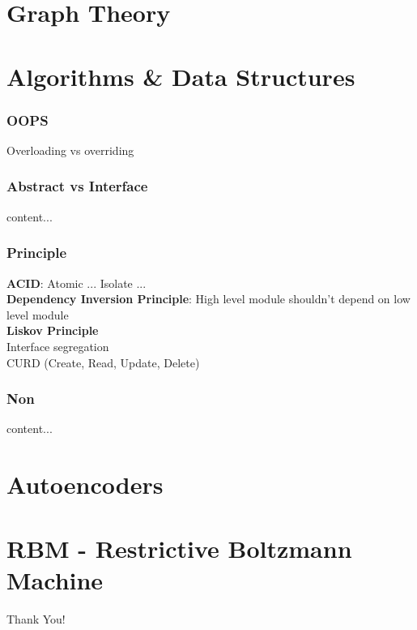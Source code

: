 \documentclass{beamer}
\begin{document}
\section{Graph Theory}


\section{Algorithms \& Data Structures}
\begin{frame}\frametitle{OOPS}
	Overloading vs overriding
\end{frame}

\begin{frame}\frametitle{Abstract vs Interface}
	content...
\end{frame}

\begin{frame}\frametitle{Principle}
	\textbf{ACID}: Atomic ... Isolate ...\\
	\textbf{Dependency Inversion Principle}: High level module shouldn't depend on low level module\\
	\textbf{Liskov Principle}\\
	Interface segregation\\
	CURD (Create, Read, Update, Delete)\\
\end{frame}


\begin{frame}\frametitle{Non}
	content...
\end{frame}


\section{Autoencoders}


\section{RBM - Restrictive Boltzmann Machine}






\begin{frame}
	Thank You!
\end{frame}
\end{document}
